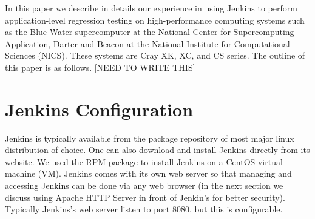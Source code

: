 \documentclass[10pt, conference, compsocconf]{IEEEtran}
\begin{document}
In this paper we describe in details our experience in using Jenkins to perform application-level regression testing on high-performance computing systems such as the Blue Water supercomputer at the National Center for Supercomputing Application, Darter and Beacon at the National Institute for Computational Sciences (NICS). These systems are Cray XK, XC, and CS series. The outline of this paper is as follows. [NEED TO WRITE THIS]


\section{Jenkins Configuration}
\label{sec:JenkinsConfiguration}


Jenkins is typically available from the package repository of most major linux distribution of choice. One can also download and install Jenkins directly from its website. We used the RPM package to install Jenkins on a CentOS virtual machine (VM). Jenkins comes with its own web server so that managing and accessing Jenkins can be done via any web browser (in the next section we discuss using Apache HTTP Server in front of Jenkin's for better security). Typically Jenkins's web server listen to port 8080, but this is configurable. 
\end{document}
